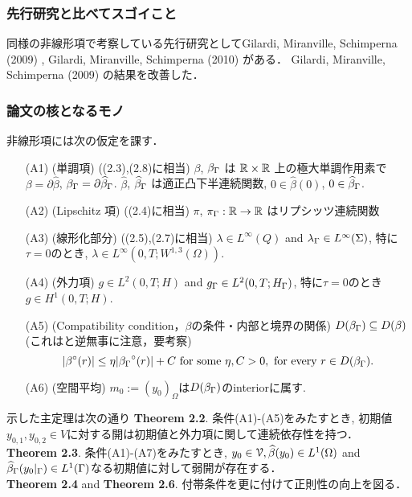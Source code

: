\documentclass[openary, a4paper, oneside]{jsarticle}
\begin{document}
	\subsubsection{先行研究と比べてスゴイこと}
	同様の非線形項で考察している先行研究としてGilardi, Miranville, Schimperna (2009) \cite{GilardiMiranvilleSchimperna2009}, Gilardi, Miranville, Schimperna (2010) \cite{GilardiMiranvilleSchimperna2010}がある．
	Gilardi, Miranville, Schimperna (2009) \cite{GilardiMiranvilleSchimperna2009} の結果を改善した．
	\subsubsection{論文の核となるモノ}
	非線形項には次の仮定を課す．
	\begin{itemize}
		\item[(A1)] (単調項) ((2.3),(2.8)に相当) $\beta$, $\beta_{\Gamma}$ は $\mathbb{R}\times\mathbb{R}$ 上の極大単調作用素で $\beta = \partial\hat{\beta}$, $\beta_{\Gamma} = \partial\widehat{\beta}_{\Gamma}$.
		$\hat{\beta}$, $\widehat{\beta}_{\Gamma}$ は適正凸下半連続関数, $0 \in \hat{\beta}(0)$, $0 \in \widehat{\beta}_{\Gamma}$.
		\item[(A2)] (Lipschitz 項) ((2.4)に相当) $\pi$, $\pi_{\Gamma}:\mathbb{R}\to\mathbb{R}$ はリプシッツ連続関数
		\item[(A3)] (線形化部分) ((2.5),(2.7)に相当) $\lambda\in L^{\infty}(Q)$ and $\lambda_{\Gamma}\in L^{\infty}(\Sigma)$, 特に$\tau=0$のとき, $\lambda\in L^{\infty}(0,T;W^{1,3}(\Omega))$.
		\item[(A4)] (外力項) $g\in L^2(0,T;H)$ and $g_{\Gamma}\in L^2(0,T;H_{\Gamma})$, 特に$\tau=0$のとき$g\in H^1(0,T;H)$.
		\item[(A5)] (Compatibility condition，$\beta$の条件・内部と境界の関係) $D(\beta_{\Gamma}) \subseteq D(\beta)$(これは\cite{GilardiMiranvilleSchimperna2009}と逆無事に注意，要考察)
		\begin{equation}
			|{\beta}^{\circ}(r)| \leq \eta|{\beta_{\Gamma}}^{\circ}(r)| + C \text{ for some }\eta, C > 0, \text{ for every }r\in D(\beta_{\Gamma}).
		\end{equation} 
		\item[(A6)] (空間平均) $m_0:=(y_0)_{\Omega}$は$D(\beta_{\Gamma})$のinteriorに属す.
	\end{itemize}
	示した主定理は次の通り
	{\bf Theorem 2.2}.
	条件(A1)-(A5)をみたすとき, 初期値$y_{0,1},y_{0,2}\in V$に対する開は初期値と外力項に関して連続依存性を持つ．\\
	{\bf Theorem 2.3}.
	条件(A1)-(A7)をみたすとき, $y_0\in \mathcal{V}, \widehat{\beta}(y_0)\in L^1(\Omega)$ and $\widehat{\beta}_{\Gamma}(y_0|_{\Gamma})\in L^1(\Gamma)$なる初期値に対して弱開が存在する．\\
	{\bf Theorem 2.4} and {\bf Theorem 2.6}.
	付帯条件を更に付けて正則性の向上を図る．
\end{document}
